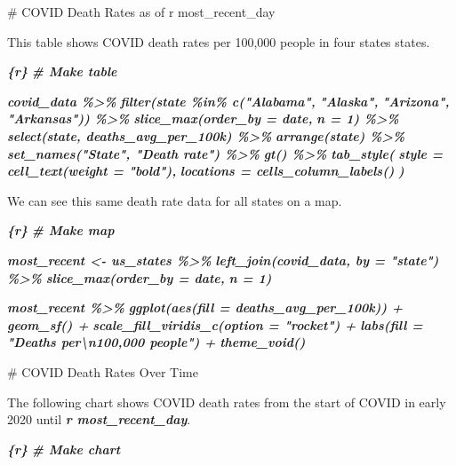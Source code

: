 \documentclass[
]{book}
\newenvironment{Shaded}{\begin{snugshade}}{\end{snugshade}}
\newcommand{\FunctionTok}[1]{\textcolor[rgb]{0.00,0.00,0.00}{#1}}
\newcommand{\InformationTok}[1]{\textcolor[rgb]{0.56,0.35,0.01}{\textbf{\textit{#1}}}}
\newcommand{\NormalTok}[1]{#1}
\begin{document}
\begin{Shaded}
\begin{Highlighting}[]
\FunctionTok{\# COVID Death Rates as of \textasciigrave{}r most\_recent\_day\textasciigrave{}}

\NormalTok{This table shows COVID death rates per 100,000 people in four states states.}

\InformationTok{\textasciigrave{}\textasciigrave{}\textasciigrave{}\{r\}}
\InformationTok{\# Make table}

\InformationTok{covid\_data \%\textgreater{}\% }
\InformationTok{  filter(state \%in\% c("Alabama",}
\InformationTok{                      "Alaska",}
\InformationTok{                      "Arizona",}
\InformationTok{                      "Arkansas")) \%\textgreater{}\% }
\InformationTok{  slice\_max(order\_by = date,}
\InformationTok{            n = 1) \%\textgreater{}\% }
\InformationTok{  select(state, deaths\_avg\_per\_100k) \%\textgreater{}\% }
\InformationTok{  arrange(state) \%\textgreater{}\% }
\InformationTok{  set\_names("State", "Death rate") \%\textgreater{}\% }
\InformationTok{  gt() \%\textgreater{}\% }
\InformationTok{  tab\_style(}
\InformationTok{    style = cell\_text(weight = "bold"),}
\InformationTok{    locations = cells\_column\_labels()}
\InformationTok{  )}
\InformationTok{\textasciigrave{}\textasciigrave{}\textasciigrave{}}

\NormalTok{We can see this same death rate data for all states on a map.}

\InformationTok{\textasciigrave{}\textasciigrave{}\textasciigrave{}\{r\}}
\InformationTok{\# Make map}

\InformationTok{most\_recent \textless{}{-} us\_states \%\textgreater{}\% }
\InformationTok{  left\_join(covid\_data, by = "state") \%\textgreater{}\% }
\InformationTok{  slice\_max(order\_by = date,}
\InformationTok{            n = 1) }

\InformationTok{most\_recent \%\textgreater{}\% }
\InformationTok{  ggplot(aes(fill = deaths\_avg\_per\_100k)) +}
\InformationTok{  geom\_sf() +}
\InformationTok{  scale\_fill\_viridis\_c(option = "rocket") +}
\InformationTok{  labs(fill = "Deaths per\textbackslash{}n100,000 people") +}
\InformationTok{  theme\_void()}
\InformationTok{\textasciigrave{}\textasciigrave{}\textasciigrave{}}

\FunctionTok{\# COVID Death Rates Over Time}

\NormalTok{The following chart shows COVID death rates from the start of COVID in early 2020 until }\InformationTok{\textasciigrave{}r most\_recent\_day\textasciigrave{}}\NormalTok{.}

\InformationTok{\textasciigrave{}\textasciigrave{}\textasciigrave{}\{r\}}
\InformationTok{\# Make chart}


\end{Highlighting}
\end{Shaded}
\end{document}
